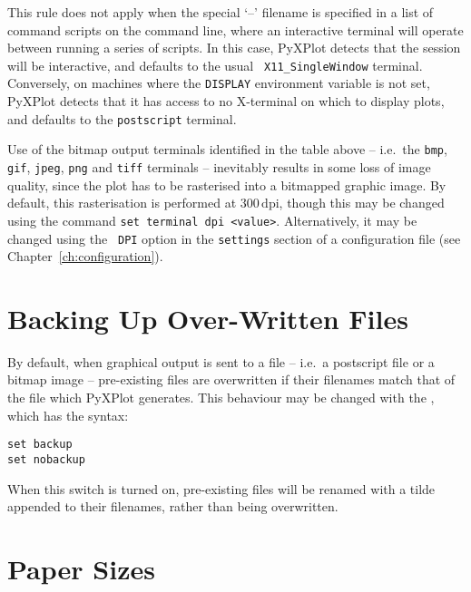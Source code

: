 This rule does not apply when the special `--' filename is specified in a list
of command scripts on the command line, where an interactive terminal will
operate between running a series of scripts. In this case, PyXPlot detects that
the session will be interactive, and defaults to the usual {\tt
X11\_SingleWindow} terminal. Conversely, on machines where the {\tt DISPLAY}
environment variable is not set, PyXPlot detects that it has access to no
X-terminal on which to display plots, and defaults to the {\tt postscript}
terminal.

Use of the bitmap output terminals identified in the table above -- i.e.\ the
{\tt bmp}, {\tt gif}, {\tt jpeg}, {\tt png} and {\tt tiff} terminals --
inevitably results in some loss of image quality, since the plot has to be
rasterised into a bitmapped graphic image.  By default, this rasterisation is
performed at $300\,\mathrm{dpi}$, though this may be changed using the command
{\tt set terminal dpi <value>}. Alternatively, it may be changed using the {\tt
DPI} option in the {\tt settings} section of a configuration file (see
Chapter~\ref{ch:configuration}).

\section{Backing Up Over-Written Files}

\label{sec:file_backup}

By default, when graphical output is sent to a file -- i.e.\ a postscript file or
a bitmap image -- pre-existing files are overwritten if their filenames match
that of the file which PyXPlot generates. This behaviour may be changed with
the , which has the syntax:

\begin{verbatim}
set backup
set nobackup
\end{verbatim}

When this switch is turned on, pre-existing files will be renamed with a tilde
appended to their filenames, rather than being overwritten.

\section{Paper Sizes}
\label{sec:set_papersize}

